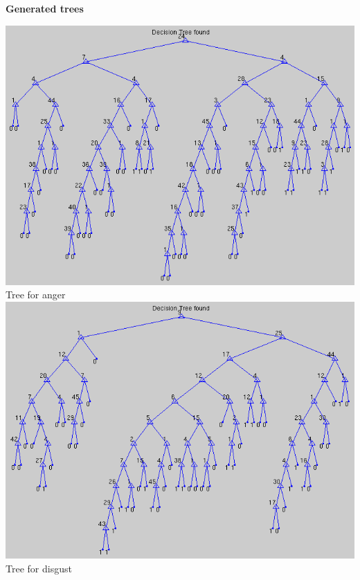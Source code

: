 \documentclass[12pt]{article}
\begin{document}
{\bf Generated trees} \\
\begin{center}
  \includegraphics[scale=0.28]{report-images/tree1.png} \\
  Tree for anger \\
  \vspace{\baselineskip}
  \includegraphics[scale=0.28]{report-images/tree2.png} \\
  Tree for disgust \\
  \vspace{\baselineskip}

\end{center}
\end{document}
